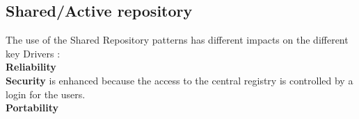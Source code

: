 \subsection{Shared/Active repository} 
The use of the Shared Repository patterns has different impacts on the different key Drivers : \\ 
\textbf{Reliability} \\
\textbf{Security} is enhanced because the access to the central registry is controlled by a login for the users. \\
\textbf{Portability} \\

